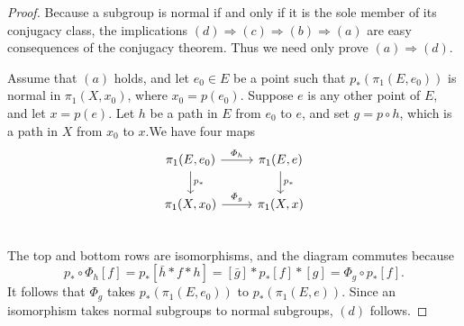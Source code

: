 \begin{proof}
Because a subgroup is normal if and only if it is the sole member of its conjugacy class, the implications $(d)\Rightarrow(c)\Rightarrow(b)\Rightarrow(a)$ are easy consequences of the conjugacy theorem. Thus we need only prove $(a)\Rightarrow(d)$.\par
Assume that $(a)$ holds, and let $e_0\in E$ be a point such that $p_*(\pi_1(E,e_0))$ is normal in $\pi_1(X,x_0)$, where $x_0=p(e_0)$. Suppose $e$ is any other point of $E$, and let $x=p(e)$. Let $h$ be a path in $E$ from $e_0$ to $e$, and set $g=p\circ h$, which is a path in $X$ from $x_0$ to $x$.We have four maps
\[\begin{tikzcd}
\pi_1(E,e_0)\ar[d,"p_*"]\ar[r,"\varPhi_h"]&\pi_1(E,e)\ar[d,"p_*"]\\
\pi_1(X,x_0)\ar[r,"\varPhi_g"]&\pi_1(X,x)\\
\end{tikzcd}\]
The top and bottom rows are isomorphisms, and the diagram commutes because
\[p_*\circ\varPhi_h[f]=p_*[\bar{h}\ast f\ast h]=[\bar{g}]\ast p_*[f]\ast[g]=\varPhi_g\circ p_*[f].\]
It follows that $\varPhi_g$ takes $p_*(\pi_1(E,e_0))$ to $p_*(\pi_1(E,e))$. Since an isomorphism takes normal subgroups to normal subgroups, $(d)$ follows.
\end{proof}
